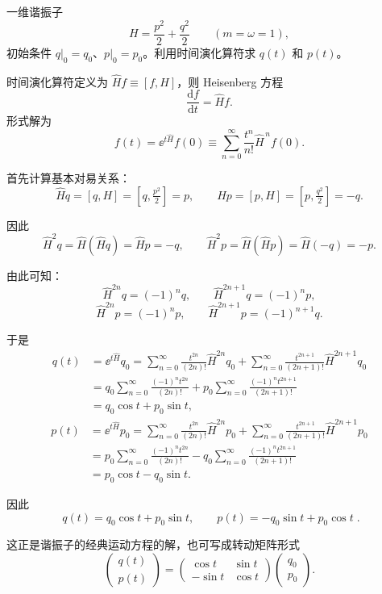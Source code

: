 \begin{question}
一维谐振子
\[
H = \frac{p^2}{2} + \frac{q^2}{2}\qquad (m=\omega=1),
\]
初始条件 \(q|_0=q_0\)、\(p|_0=p_0\)。利用时间演化算符求 \(q(t)\) 和 \(p(t)\)。
\begin{solution}
时间演化算符定义为 \(\hat H f \equiv [f,H]\)，则 Heisenberg 方程
\[
\frac{\mathrm d f}{\mathrm d t} = \hat H f.
\]
形式解为
\[
f(t) = \ee^{t\hat H} f(0) \equiv \sum_{n=0}^\infty \frac{t^n}{n!}\hat H^{\,n} f(0).
\]

首先计算基本对易关系：
\[
\hat H q = [q, H] = [q, \tfrac{p^2}{2}] = p,
\qquad
\hat H p = [p, H] = [p, \tfrac{q^2}{2}] = -q.
\]

因此
\[
\hat H^2 q = \hat H(\hat H q) = \hat H p = -q,
\qquad
\hat H^2 p = \hat H(\hat H p) = \hat H(-q) = -p.
\]

由此可知：
\[
\hat H^{2n} q = (-1)^n q,\qquad
\hat H^{2n+1} q = (-1)^n p,
\]
\[
\hat H^{2n} p = (-1)^n p,\qquad
\hat H^{2n+1} p = (-1)^{n+1} q.
\]

于是
\[
\begin{aligned}
q(t) &= \ee^{t\hat H} q_0 = \sum_{n=0}^\infty \frac{t^{2n}}{(2n)!}\hat H^{2n} q_0
+ \sum_{n=0}^\infty \frac{t^{2n+1}}{(2n+1)!}\hat H^{2n+1} q_0 \\
&= q_0\sum_{n=0}^\infty \frac{(-1)^n t^{2n}}{(2n)!}
+ p_0\sum_{n=0}^\infty \frac{(-1)^n t^{2n+1}}{(2n+1)!} \\
&= q_0\cos t + p_0\sin t,
\end{aligned}
\]
\[
\begin{aligned}
p(t) &= \ee^{t\hat H} p_0 = \sum_{n=0}^\infty \frac{t^{2n}}{(2n)!}\hat H^{2n} p_0
+ \sum_{n=0}^\infty \frac{t^{2n+1}}{(2n+1)!}\hat H^{2n+1} p_0 \\
&= p_0\sum_{n=0}^\infty \frac{(-1)^n t^{2n}}{(2n)!}
- q_0\sum_{n=0}^\infty \frac{(-1)^n t^{2n+1}}{(2n+1)!} \\
&= p_0\cos t - q_0\sin t.
\end{aligned}
\]

因此
\[
\boxed{\;q(t) = q_0\cos t + p_0\sin t,\qquad
p(t) = -q_0\sin t + p_0\cos t\;}.
\]

这正是谐振子的经典运动方程的解，也可写成转动矩阵形式
\[
\begin{pmatrix} q(t) \\ p(t) \end{pmatrix}
= \begin{pmatrix} \cos t & \sin t \\ -\sin t & \cos t \end{pmatrix}
\begin{pmatrix} q_0 \\ p_0 \end{pmatrix}.
\]

\end{solution}
\end{question}

